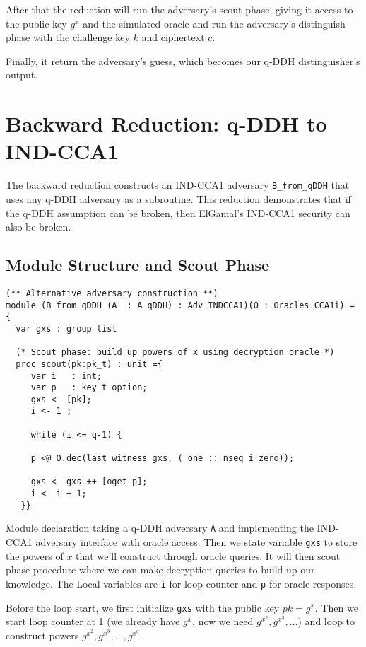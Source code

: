 After that the reduction will run the adversary's scout phase, giving it access to the public key $g^x$ and the simulated oracle and run the adversary's distinguish phase with the challenge key $k$ and ciphertext $c$.

Finally, it return the adversary's guess, which becomes our q-DDH distinguisher's output.


\section{Backward Reduction: q-DDH to IND-CCA1}
\label{sec:backward-reduction4}

The backward reduction constructs an IND-CCA1 adversary \texttt{B\_from\_qDDH} that uses any q-DDH adversary as a subroutine. This reduction demonstrates that if the q-DDH assumption can be broken, then ElGamal's IND-CCA1 security can also be broken.

\subsection{Module Structure and Scout Phase}

\begin{lstlisting}[style=easycrypt, caption=B\_from\_qDDH Module Structure, breaklines=true, breakatwhitespace=true, frame=single, keepspaces=true]
(** Alternative adversary construction **)
module (B_from_qDDH (A  : A_qDDH) : Adv_INDCCA1)(O : Oracles_CCA1i) = {
  var gxs : group list

  (* Scout phase: build up powers of x using decryption oracle *)
  proc scout(pk:pk_t) : unit ={
     var i   : int;
     var p   : key_t option;
     gxs <- [pk];  
     i <- 1 ;

     while (i <= q-1) {
     
     p <@ O.dec(last witness gxs, ( one :: nseq i zero));
     
     gxs <- gxs ++ [oget p];
     i <- i + 1;
   }}
\end{lstlisting}


Module declaration taking a q-DDH adversary \texttt{A} and implementing the IND-CCA1 adversary interface with oracle access. Then we state variable \texttt{gxs} to store the powers of $x$ that we'll construct through oracle queries. It will then scout phase procedure where we can make decryption queries to build up our knowledge. The Local variables are \texttt{i} for loop counter and \texttt{p} for oracle responses.

Before the loop start, we first initialize \texttt{gxs} with the public key $pk = g^x$. Then we start loop counter at 1 (we already have $g^x$, now we need $g^{x^2}, g^{x^3}, \ldots$) and loop to construct powers $g^{x^2}, g^{x^3}, \ldots, g^{x^q}$.

